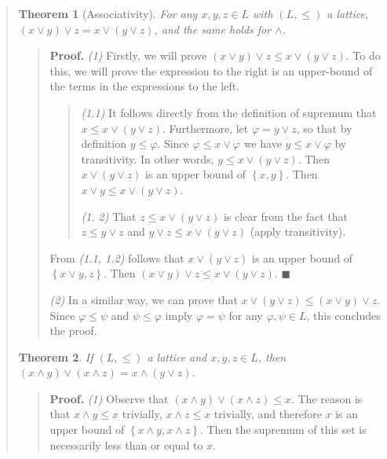 \documentclass[a4paper, 12pt]{article}
\newtheorem{theorem}{Theorem}
\newtheorem{theorem}{Theorem}
\begin{document}
\begin{quote}
\begin{theorem}[Associativity]
    For any $x, y, z \in L$ with $(L, \leq)$ a lattice, $(x \lor y) \lor z = x
    \lor (y \lor  z)$, and the same holds for $\land $.
\end{theorem}


\small
\begin{quote}

\textbf{Proof.} \textit{(1)} Firstly, we will prove $(x \lor  y) \lor  z \leq x
\lor  (y \lor  z)$. To do this, we will prove the expression to the right is an
upper-bound of the terms in the expressions to the left. 

\begin{quote}

    \textit{(1.1)} It follows directly from the definition of supremum that $x
    \leq x \lor  (y \lor  z)$. Furthermore, let $\varphi = y \lor  z$, so that
    by definition $y \leq \varphi$. Since $\varphi \leq x \lor  \varphi$ we have
    $y \leq x \lor \varphi$ by transitivity. In other words, $y \leq x \lor  (y
    \lor  z)$. Then $x \lor  (y \lor  z)$ is an upper bound of $\left\{ x, y
    \right\} $. Then $x \lor y \leq x \lor  (y \lor  z)$.

    \textit{(1. 2)} That $z \leq x \lor  (y \lor  z)$ is clear from the fact
    that $z \leq y \lor  z$ and $y \lor  z \leq x \lor  (y \lor  z)$ (apply
    transitivity).

\end{quote}

From \textit{(1.1, 1.2)} follows that $x \lor (y \lor  z)$ is an upper bound of
$\left\{ x \lor  y, z \right\} $. Then $(x \lor  y) \lor  z \leq x \lor  (y \lor
z)$. $\blacksquare$

\textit{(2)} In a similar way, we can prove that $x \lor  (y \lor  z) \leq (x
\lor  y) \lor  z$. Since $\varphi \leq \psi$ and $\psi \leq \varphi$ imply
$\varphi = \psi$ for any $\varphi, \psi \in L$, this concludes the proof.

\end{quote}
\normalsize

\begin{theorem}
    If $(L, \leq)$ a lattice and $x, y, z \in L$, then $(x \land y) \lor (x
    \land z) = x \land (y \lor  z)$. 
\end{theorem}


\small
\begin{quote}

\textbf{Proof.} \textit{(1)} Observe that $(x \land  y) \lor   (x \land  z) \leq
x$. The reason is that $x \land  y \leq x $ trivially, $x \land  z \leq x$
trivially, and therefore $x$ is an upper bound of $\left\{ x \land  y, x \land
z\right\} $. Then the supremum of this set is necessarily less than or equal to
$x$.


\end{quote}
\end{quote}
\end{document}
